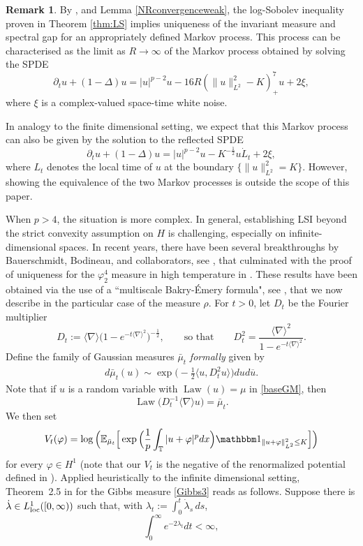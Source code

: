 \documentclass[letterpaper, 11pt,  reqno]{amsart}
\theoremstyle{definition}
\newtheorem{remark}[theorem]{Remark}
\DeclareMathOperator{\Law}{Law}
\newcommand{\1}{\mathbbm 1}
\newcommand{\T}{\mathbb{T}}
\newcommand{\0}{\mathbf 0}
\newcommand{\E}{\mathbb{E}}
\newcommand{\nb}{\nabla}
\newcommand{\vp}{\varphi}
\newcommand{\ld}{\lambda}
\newcommand{\cj}{\overline}
\newcommand{\jb}[1]
{\langle #1 \rangle}
\newcommand{\ph}{\varphi}
\numberwithin{equation}{section}
\numberwithin{theorem}{section}
\begin{document}
\begin{remark}
By \cite[Theorem 4.9]{GZ}, and Lemma \ref{NRconvergenceweak}, the log-Sobolev inequality proven in Theorem \ref{thm:LS} implies uniqueness of the invariant measure and spectral gap for an appropriately defined Markov process. This process can be characterised as the limit as $R\to \infty$ of the Markov process obtained by solving the SPDE
$$ \partial_t u + (1 -\Delta) u = |u|^{p-2}u -16 R (\|u\|_{L^2}^2 - K)_+^7 u + 2\xi, $$
where $\xi$ is a complex-valued space-time white noise.
 
In analogy to the finite dimensional setting, we expect that this Markov process can also be given by the solution to the reflected SPDE
$$\partial_t u + (1 -\Delta) u = |u|^{p-2}u - K^{-\frac12} u \dot L_t + 2\xi, $$
where $L_t$ denotes the local time of $u$ at the boundary $\{ \| u \|_{L^2}^2 = K \}$. However, showing the equivalence of the two Markov processes is outside the scope of this paper.
\end{remark}
 
 
 
When $p > 4$, the situation is more complex.
In general, establishing LSI beyond
the strict convexity assumption on
$H$ is challenging, especially on infinite-dimensional spaces.
In recent years, there have been several breakthroughs by Bauerschmidt, Bodineau, and collaborators, see
\cite{BB1, BB2, BBD, BaDa}, that culminated with the proof of uniqueness for the $\ph^4_2$ measure in high temperature in \cite{BDW}. These results have been obtained via the use of a ``multiscale Bakry-\'Emery formula", see \cite[Theorem 2.5]{BB2}, that we now describe in the particular case of the measure $\rho$.
For $t>0$, let $D_t$ be the Fourier multiplier
\[
D_t:=\jb\nb\big(1-e^{-t\jb\nb^2}\big)^{-\frac12},
\qquad\text{so that}\qquad
D_t^2=\frac{\jb\nb^2}{1-e^{-t\jb\nb^2}} .
\]
Define the family of Gaussian measures $\bar \mu_t$ \emph{formally} given by
\begin{align*}
    d\bar \mu_t (u)
    \sim
    \exp\Big(-\frac 12 \jb{u, D_t^2u}\Big) dud\cj u.
\end{align*}
Note that if $u$ is a random variable with $\Law(u) = \mu$ in \eqref{baseGM}, then
\begin{equation}
    \Law\big(D_t^{-1}\jb\nb u\big) = \bar \mu_t.
\end{equation}
We then set
\begin{align*}
    V_t(\vp)
    =  \log\Big(\E_{\bar \mu_t} \Big[ \exp\Big(\frac 1p \int_\T |u+ \ph|^p dx\Big)\1_{ \| u + \ph \|_{L^2}^2 \le K} \Big]\Big)
\end{align*}
for every $\vp\in H^1$
(note that our $V_t$ is the negative of the
renormalized potential defined in \cite{BB2}).
Applied heuristically to the infinite dimensional setting, Theorem~2.5 in \cite{BB2} for the Gibbs measure \eqref{Gibbs3} reads as follows. Suppose there
is $\dot\ld\in L^1_{\rm loc}([0,\infty))$ such that, with $\ld_t:=\int_0^t\dot\ld_s\,ds$,
$$ \int_0^\infty e^{-2 \ld_t} dt < \infty, $$
 
\end{document}
